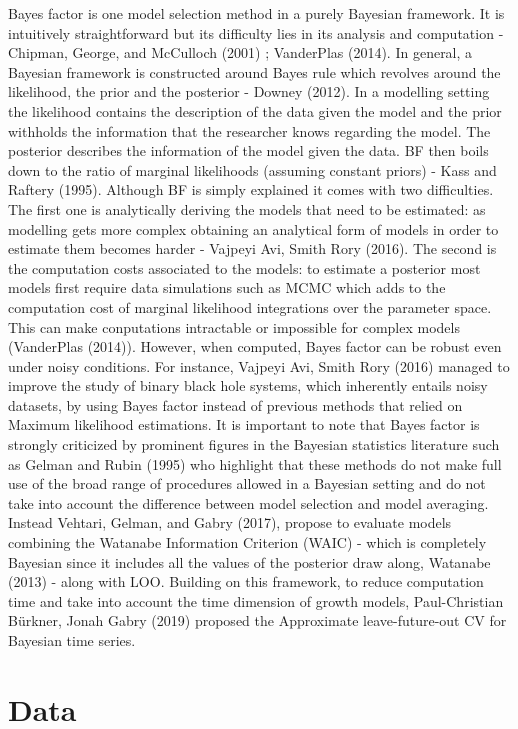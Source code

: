 \documentclass[]{article}
\begin{document}
Bayes factor is one model selection method in a purely Bayesian
framework. It is intuitively straightforward but its difficulty lies in
its analysis and computation - Chipman, George, and McCulloch (2001) ;
VanderPlas (2014). In general, a Bayesian framework is constructed
around Bayes rule which revolves around the likelihood, the prior and
the posterior - Downey (2012). In a modelling setting the likelihood
contains the description of the data given the model and the prior
withholds the information that the researcher knows regarding the model.
The posterior describes the information of the model given the data. BF
then boils down to the ratio of marginal likelihoods (assuming constant
priors) - Kass and Raftery (1995). Although BF is simply explained it
comes with two difficulties. The first one is analytically deriving the
models that need to be estimated: as modelling gets more complex
obtaining an analytical form of models in order to estimate them becomes
harder - Vajpeyi Avi, Smith Rory (2016). The second is the computation
costs associated to the models: to estimate a posterior most models
first require data simulations such as MCMC which adds to the
computation cost of marginal likelihood integrations over the parameter
space. This can make conputations intractable or impossible for complex
models (VanderPlas (2014)). However, when computed, Bayes factor can be
robust even under noisy conditions. For instance, Vajpeyi Avi, Smith
Rory (2016) managed to improve the study of binary black hole systems,
which inherently entails noisy datasets, by using Bayes factor instead
of previous methods that relied on Maximum likelihood estimations. It is
important to note that Bayes factor is strongly criticized by prominent
figures in the Bayesian statistics literature such as Gelman and Rubin
(1995) who highlight that these methods do not make full use of the
broad range of procedures allowed in a Bayesian setting and do not take
into account the difference between model selection and model averaging.
Instead Vehtari, Gelman, and Gabry (2017), propose to evaluate models
combining the Watanabe Information Criterion (WAIC) - which is
completely Bayesian since it includes all the values of the posterior
draw along, Watanabe (2013) - along with LOO. Building on this
framework, to reduce computation time and take into account the time
dimension of growth models, Paul-Christian Bürkner, Jonah Gabry (2019)
proposed the Approximate leave-future-out CV for Bayesian time series.

\hypertarget{data}{%
\section{Data}\label{data}}
\end{document}
